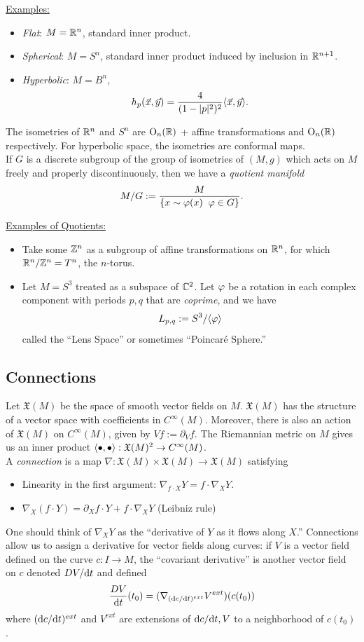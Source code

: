 \documentclass{amsart}
\renewcommand{\X}{\mathfrak{X}}
\begin{document}
	\underline{Examples:}
	\begin{itemize}
		\item \textit{Flat}: $M=\mathbb{R}^n$, standard inner product.
		\item \textit{Spherical}: $M=S^n$, standard inner product induced by inclusion in $\mathbb{R}^{n+1}$.
		\item \textit{Hyperbolic}: $M=B^n$, 
		$$h_p(\vec{x},\vec{y}) = \frac{4}{(1-|p|^2)^2} \langle\vec{x},\vec{y}\rangle.$$
	\end{itemize}
	
	The isometries of $\mathbb{R}^n$ and $S^n$ are $\mathrm{O}_n(\mathbb{R})$ + affine transformations and $\mathrm{O}_n(\mathbb{R})$ respectively. For hyperbolic space, the isometries are conformal maps.\\
	
	If $G$ is a discrete subgroup of the group of isometries of $(M,g)$ which acts on $M$ freely and properly discontinuously, then we have a \textit{quotient manifold}
	$$
	M/G := \frac{M}{\{x\sim \varphi (x) \;\; \varphi\in G\}}.
	$$
	
	\underline{Examples of Quotients:}
	\begin{itemize}
		\item Take some $\mathbb{Z}^n$ as a subgroup of affine transformations on $\mathbb{R}^n$, for which $\mathbb{R}^n/\mathbb{Z}^n=T^n$, the $n$-torus.
		\item Let $M=S^3$ treated as a subspace of $\mathbb{C}^2$. Let $\varphi$ be a rotation in each complex component with periods $p,q$ that are \textit{coprime}, and we have
		$$
		L_{p,q} := S^3/\langle\varphi\rangle 
		$$
		called the ``Lens Space'' or sometimes ``Poincar\'e Sphere.''\\
	\end{itemize}
	
	\subsection{Connections} Let $\X(M)$ be the space of smooth vector fields on $M$. $\X(M)$ has the structure of a vector space with coefficients in $C^{\infty}(M)$. Moreover, there is also an action of $\X(M)$ on $C^{\infty}(M)$, given by $Vf := \partial_V f$. The Riemannian metric on $M$ gives us an inner product $\<\bullet,\bullet\>:\X(M)^2\to C^{\infty}(M)$.\\
	
	A \textit{connection} is a map $\nabla:\X(M)\times \X(M)\to \X(M)$ satisfying 
	\begin{itemize}
		\item Linearity in the first argument: $\nabla_{f\cdot X}Y = f\cdot \nabla_XY$.
		\item $\nabla_X (f\cdot Y) = \partial_Xf \cdot Y + f \cdot \nabla_X Y$ (Leibniz rule)
	\end{itemize}
	One should think of $\nabla_X Y$ as the ``derivative of $Y$ as it flows along $X$.'' Connections allow us to assign a derivative for vector fields along curves: if $V$ is a vector field defined on the curve $c:I\to M$, the ``covariant derivative'' is another vector field on $c$ denoted $D V/\textrm{d} t$ and defined
	$$
	\frac{DV}{\textrm{d} t}(t_0) = (\nabla_{(\textrm{d} c/\textrm{d} t)^{ext}}V^{ext})(c(t_0))
	$$
	where $(\textrm{d} c/\textrm{d} t)^{ext}$ and $V^{ext}$ are extensions of $\textrm{d} c/\textrm{d} t,V$ to a neighborhood of $c(t_0)$.\\
	
\end{document}
